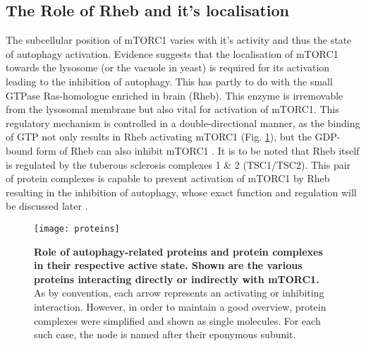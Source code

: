 \documentclass[12pt]{article} %
\begin{document}
\begin{linenumbers*}
\subsection{The Role of Rheb and it's localisation} The subcellular position of mTORC1 varies with it's activity and thus the state of autophagy activation. 
Evidence suggests that the localisation of mTORC1 towards the lysosome (or the vacuole in yeast) is required for its activation leading to the inhibition of autophagy.
This has partly to do with the small GTPase Ras-homologue enriched in brain (Rheb). This enzyme is irremovable from the lysosomal membrane but also vital for activation of mTORC1. This regulatory mechanism is controlled in a double-directional manner, as the binding of GTP not only results in Rheb activating mTORC1 (Fig. \ref{prot}), but the GDP-bound form of Rheb can also inhibit mTORC1 \citep{Noda2017, Carroll2017}. 
It is to be noted that Rheb itself is regulated by the tuberous sclerosis complexes 1 \& 2 (TSC1/TSC2).
This pair of protein complexes is capable to prevent activation of mTORC1 by Rheb resulting in the inhibition of autophagy, whose exact function and regulation will be discussed later \citep{RabanalRuiz2017}.

\begin{figure}
\centering
\texttt{[image: proteins]}
\caption{\textbf{Role of autophagy-related proteins and protein complexes in their respective active state. Shown are the various proteins interacting directly or indirectly with mTORC1.} As by convention, each arrow represents an activating or inhibiting interaction. However, in order to maintain a good overview, protein complexes were simplified and shown as single molecules. For each such case, the node is named after their eponymous subunit.} 
\label{prot}
\end{figure}

\newpage

\end{linenumbers*}
\end{document}
